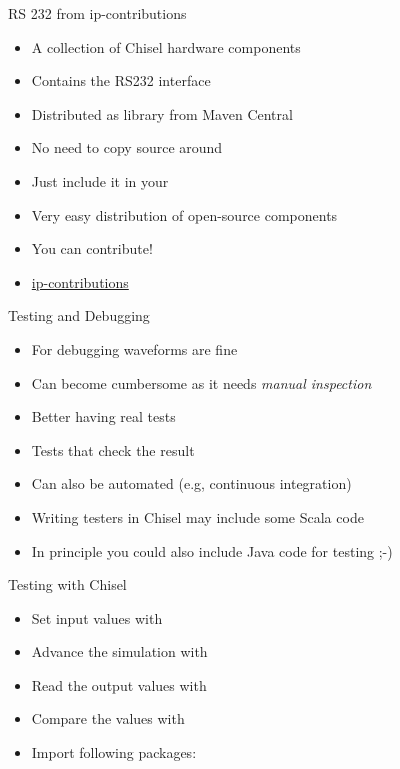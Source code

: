 \begin{frame}[fragile]{RS 232 from ip-contributions}
\begin{itemize}
\item A collection of Chisel hardware components
\item Contains the RS232 interface
\item Distributed as library from Maven Central
\item No need to copy source around
\item Just include it in your 
\item Very easy distribution of open-source components
\item You can contribute!
\item \href{https://github.com/freechipsproject/ip-contributions}{ip-contributions}
\end{itemize}
\end{frame}

\begin{frame}[fragile]{Testing and Debugging}
\begin{itemize}
\item For debugging waveforms are fine
\item Can become cumbersome as it needs \emph{manual inspection}
\item Better having real tests
\item Tests that check the result
\item Can also be automated (e.g, continuous integration)
\item Writing testers in Chisel may include some Scala code
\item In principle you could also include Java code for testing ;-)
\end{itemize}
\end{frame}

\begin{frame}[fragile]{Testing with Chisel}
\begin{itemize}
\item Set input values with 
\item Advance the simulation with 
\item Read the output values with 
\item Compare the values with 
\item Import following packages:
\end{itemize}
\end{frame}

